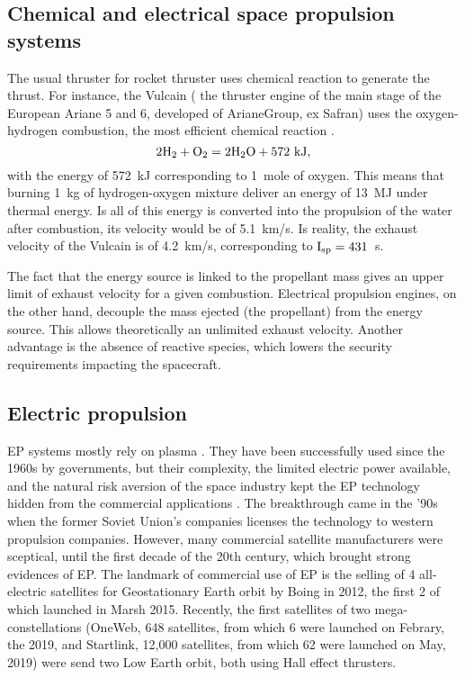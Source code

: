 \subsection*{Chemical and electrical space propulsion systems}
The usual thruster for rocket thruster uses chemical reaction to generate the thrust.
For instance, the Vulcain ( the thruster engine of the main stage of the European Ariane 5 and 6, developed of ArianeGroup, ex Safran) uses the oxygen-hydrogen combustion, the most efficient chemical reaction \citep{nasa-H2O2}.
\begin{equation*}
  2 {\rm H_2} + { \rm O_2} = 2 {\rm H_2 O} + 572 \text{~kJ},
\end{equation*}
with the energy of 572~kJ corresponding to 1~mole of oxygen.
This means that burning 1~kg of hydrogen-oxygen mixture deliver an energy of 13~MJ under thermal energy. 
Is all of this energy is converted into the propulsion of the water after combustion, its velocity would be of 5.1~km/s.
Is reality, the exhaust velocity of the Vulcain is of 4.2~km/s, corresponding to $\rm I_{\rm sp}=431$~s.

The fact that the energy source is linked to the propellant mass gives an upper limit of exhaust velocity for a given combustion.
Electrical propulsion engines, on the other hand, decouple the mass ejected (the propellant) from the energy source.
This allows theoretically an unlimited exhaust velocity.
Another advantage is the absence of reactive species, which lowers the security requirements impacting the spacecraft.

\subsection*{Electric propulsion} \label{subsec-label}
\ac{EP} systems mostly rely on plasma \citep{charles2009,mazouffre2016}.
They have been successfully used since the 1960s by governments, but their complexity, the limited electric power available, and the natural risk aversion of the space industry kept the \ac{EP} technology hidden from the commercial applications \citep{lev2019}.
The breakthrough came in the '90s when the former Soviet Union's companies licenses the technology to western propulsion companies.
However, many commercial satellite manufacturers were sceptical, until the first decade of the 20th century, which brought strong evidences of \ac{EP}.
The landmark of commercial use of \ac{EP} is the selling of 4 all-electric satellites for Geostationary Earth orbit by Boing in 2012, the first 2 of which launched in Marsh 2015.
Recently, the first satellites of two mega-constellations (OneWeb, 648 satellites, from which 6 were launched on Febrary, the  2019, and Startlink, 12,000 satellites, from which 62 were launched on May,  2019) were send two Low Earth orbit, both using Hall effect thrusters. 

